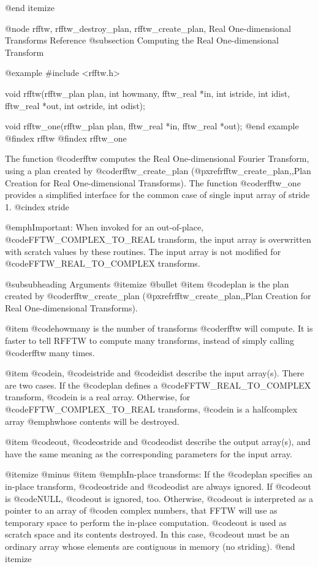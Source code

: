 @end itemize

@node    rfftw, rfftw_destroy_plan, rfftw_create_plan, Real One-dimensional Transforms Reference
@subsection Computing the Real One-dimensional Transform

@example
#include <rfftw.h>

void rfftw(rfftw_plan plan, int howmany, 
           fftw_real *in, int istride, int idist, 
           fftw_real *out, int ostride, int odist);

void rfftw_one(rfftw_plan plan, fftw_real *in, fftw_real *out);
@end example
@findex rfftw
@findex rfftw_one

The function @code{rfftw} computes the Real One-dimensional Fourier
Transform, using a plan created by @code{rfftw_create_plan}
(@pxref{rfftw_create_plan,,Plan Creation for Real One-dimensional
Transforms}).  The function @code{rfftw_one} provides a simplified
interface for the common case of single input array of stride 1.
@cindex stride

@emph{Important:} When invoked for an out-of-place,
@code{FFTW_COMPLEX_TO_REAL} transform, the input array is overwritten
with scratch values by these routines.  The input array is not modified
for @code{FFTW_REAL_TO_COMPLEX} transforms.

@subsubheading Arguments
@itemize @bullet
@item
@code{plan} is the plan created by @code{rfftw_create_plan}
(@pxref{rfftw_create_plan,,Plan Creation for Real One-dimensional
Transforms}).

@item
@code{howmany} is the number of transforms @code{rfftw} will compute.
It is faster to tell RFFTW to compute many transforms, instead of
simply calling @code{rfftw} many times.

@item
@code{in}, @code{istride} and @code{idist} describe the input array(s).
There are two cases.  If the @code{plan} defines a
@code{FFTW_REAL_TO_COMPLEX} transform, @code{in} is a real array.
Otherwise, for @code{FFTW_COMPLEX_TO_REAL} transforms, @code{in} is a
halfcomplex array @emph{whose contents will be destroyed}.

@item
@code{out}, @code{ostride} and @code{odist} describe the output
array(s), and have the same meaning as the corresponding parameters for
the input array.

@itemize @minus
@item @emph{In-place transforms}:
If the @code{plan} specifies an in-place transform, @code{ostride} and
@code{odist} are always ignored.  If @code{out} is @code{NULL},
@code{out} is ignored, too.  Otherwise, @code{out} is interpreted as a
pointer to an array of @code{n} complex numbers, that FFTW will use as
temporary space to perform the in-place computation.  @code{out} is used
as scratch space and its contents destroyed.  In this case, @code{out}
must be an ordinary array whose elements are contiguous in memory (no
striding).
@end itemize

